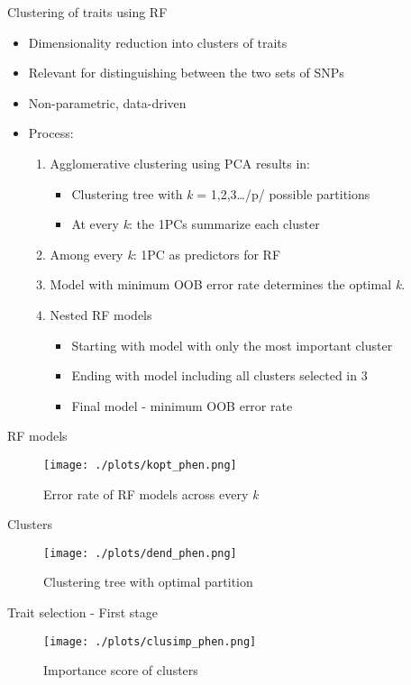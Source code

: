 \documentclass[presentation]{beamer}
\begin{document}
\begin{frame}[label={sec:org35ecae5}]{Clustering of traits using RF}
\begin{itemize}
\item Dimensionality reduction into clusters of traits
\item Relevant for distinguishing between the two sets of SNPs
\item Non-parametric, data-driven
\item Process:
\begin{enumerate}
\item Agglomerative clustering using PCA results in:
\begin{itemize}
\item Clustering tree with \emph{k} = 1,2,3\ldots{}/p/ possible partitions
\item At every \emph{k}: the 1PCs summarize each cluster
\end{itemize}
\item Among every \emph{k}: 1PC as predictors for RF
\item Model with minimum OOB error rate determines the optimal \emph{k}.
\item Nested RF models
\begin{itemize}
\item Starting with model with only the most important cluster
\item Ending with model including all clusters selected in \alert{3}
\item Final model - minimum OOB error rate
\end{itemize}
\end{enumerate}
\end{itemize}
\end{frame}
\begin{frame}[label={sec:orgd4c7cd4}]{RF models}
\begin{figure}[htbp]
\centering
\texttt{[image: ./plots/kopt\_phen.png]}
\caption[\emph{k}]{Error rate of RF models across every \emph{k}}
\end{figure}
\end{frame}
\begin{frame}[label={sec:org09586ba}]{Clusters}
\begin{figure}[htbp]
\centering
\texttt{[image: ./plots/dend\_phen.png]}
\caption{Clustering tree with optimal partition}
\end{figure}
\end{frame}
\begin{frame}[label={sec:org141a6cb}]{Trait selection - First stage}
\begin{figure}[htbp]
\centering
\texttt{[image: ./plots/clusimp\_phen.png]}
\caption{Importance score of clusters}
\end{figure}
\end{frame}
\end{document}
